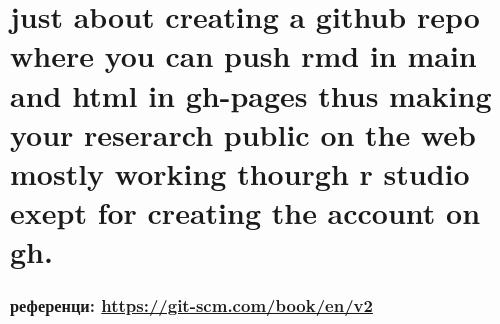 \documentclass[
]{book}
\begin{document}
\hypertarget{just-about-creating-a-github-repo-where-you-can-push-rmd-in-main-and-html-in-gh-pages-thus-making-your-reserarch-public-on-the-web-mostly-working-thourgh-r-studio-exept-for-creating-the-account-on-gh.}{%
\chapter{just about creating a github repo where you can push rmd in main and html in gh-pages thus making your reserarch public on the web mostly working thourgh r studio exept for creating the account on gh.}\label{just-about-creating-a-github-repo-where-you-can-push-rmd-in-main-and-html-in-gh-pages-thus-making-your-reserarch-public-on-the-web-mostly-working-thourgh-r-studio-exept-for-creating-the-account-on-gh.}}

\hypertarget{ux440ux435ux444ux435ux440ux435ux43dux446ux438-httpsgit-scm.combookenv2}{%
\subsection{\texorpdfstring{референци: \url{https://git-scm.com/book/en/v2}}{референци: https://git-scm.com/book/en/v2}}\label{ux440ux435ux444ux435ux440ux435ux43dux446ux438-httpsgit-scm.combookenv2}}

  
\end{document}
